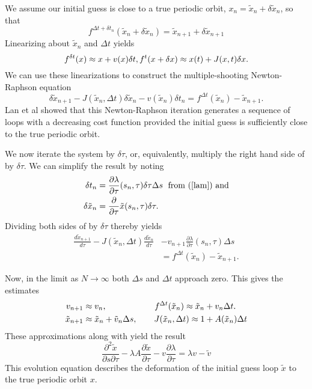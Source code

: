 \documentclass[aip,cha,reprint,
secnumarabic,
nofootinbib, tightenlines,
nobibnotes, showkeys, showpacs,
groupedaddress
]{revtex4-1}
\begin{document}
We assume our initial guess is close to a true periodic orbit, $x_n = \tilde{x}_n+\delta\tilde{x}_n$, so that
\[
f^{\Delta t + \delta t_n}(\tilde{x}_n+\delta\tilde{x}_n)=\tilde{x}_{n+1}+\delta\tilde{x}_{n+1}
\]
Linearizing about $\tilde{x}_n$ and $\Delta t$ yields
\[
f^{\delta t}(x) \approx x+v(x)\delta t, \hfill f^t(x+\delta x)\approx x(t)+J(x,t)\delta x.
\]
We can use these linearizations to construct the multiple-shooting Newton-Raphson equation
\begin{equation}
\delta \tilde{x}_{n+1}-J(\tilde{x}_n,\Delta t) \delta \tilde{x}_n - v(\tilde{x}_n)\delta t_n = f^{\Delta t}(\tilde{x}_n)-\tilde{x}_{n+1}. \label{NReq}
\end{equation}
Lan et al showed  that this Newton-Raphson iteration generates a sequence of loops with a decreasing cost function provided the initial guess is sufficiently close to the true periodic orbit.

We now iterate the system by $\delta\tau$, or, equivalently, multiply the right hand side of  by $\delta\tau$.  We can simplify the result by noting
\begin{align}
\delta t_n&=\frac{\partial \lambda}{\partial \tau}(s_n,\tau)\delta\tau\Delta s \; \mbox{    from \refeq{lam} and} \\
\delta\tilde{x}_n&=\frac{\partial}{\partial \tau}\tilde{x}(s_n,\tau)\delta\tau.
\end{align}
Dividing both sides of  by $\delta\tau$ thereby yields
\begin{align}
\frac{d\tilde{x}_{n+1}}{d\tau}-J(\tilde{x}_n,\Delta t)\frac{d\tilde{x}_n}{d\tau}&-v_{n+1}\frac{\partial \lambda}{\partial \tau}(s_n,\tau)\Delta s \nonumber \\
&=f^{\Delta t}(\tilde{x}_n)-\tilde{x}_{n+1}.
\label{SimpNR}
\end{align}

Now, in the limit as $N\to\infty$ both $\Delta s$ and $\Delta t$ approach
zero.  This gives the estimates
\begin{align}
v_{n+1} &\approx v_{n}, \hspace{20mm} f^{\Delta t}(\tilde{x}_n)\approx\tilde{x}_n+v_n\Delta t. \nonumber\\
\tilde{x}_{n+1}&\approx\tilde{x}_n+\tilde{v}_n\Delta s, \hspace{7mm} J(\tilde{x}_n,\Delta t)\approx 1+A(\tilde{x}_n)\Delta t \nonumber
\end{align}
These approximations along with  yield the result
\begin{equation}
\frac{\partial^2\tilde{x}}{\partial s \partial \tau}-\lambda A\frac{\partial \tilde{x}}{\partial \tau}-v\frac{\partial \lambda}{\partial\tau}=\lambda v-\tilde{v}
\label{POEqn}
\end{equation}
This evolution equation describes the deformation of the
initial guess loop $\tilde{x}$ to the true periodic orbit $x$.
\end{document}
